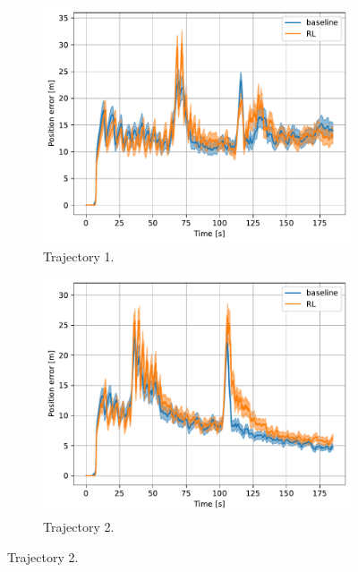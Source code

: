 \documentclass[english, 12pt, a4paper, elec, utf8, a-1b, online]{aaltothesis}
\begin{document}
\begin{figure}[htb]
    \centering
    \begin{subfigure}[b]{0.45\textwidth}
        \centering
        \includegraphics[width=\linewidth]{figures/benchmark/Simulations/mean_position_error0.pdf}
        \caption{Trajectory 1.}
        \label{fig:TL_T1}
    \end{subfigure}
    \hfill
    \begin{subfigure}[b]{0.45\textwidth}
        \centering
        \includegraphics[width=\linewidth]{figures/benchmark/Simulations/mean_position_error1.pdf}
        \caption{Trajectory 2.}
        \label{fig:TL_T2}
    \end{subfigure}

\end{figure}
\end{document}

